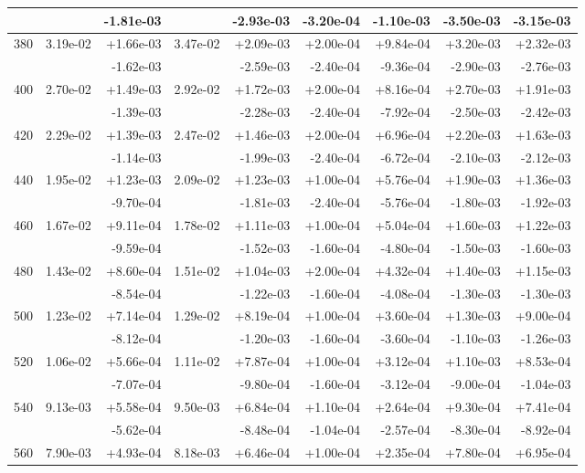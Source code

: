\begin{tabular}{|c|r|r|r|r|r|r|r|r|}
 & & -1.81e-03 & & -2.93e-03 & -3.20e-04 & -1.10e-03 & -3.50e-03 & -3.15e-03 \\
\hline
380 & 3.19e-02 & +1.66e-03 & 3.47e-02 & +2.09e-03 & +2.00e-04 & +9.84e-04 & +3.20e-03 & +2.32e-03\\
 & & -1.62e-03 & & -2.59e-03 & -2.40e-04 & -9.36e-04 & -2.90e-03 & -2.76e-03 \\
\hline
400 & 2.70e-02 & +1.49e-03 & 2.92e-02 & +1.72e-03 & +2.00e-04 & +8.16e-04 & +2.70e-03 & +1.91e-03\\
 & & -1.39e-03 & & -2.28e-03 & -2.40e-04 & -7.92e-04 & -2.50e-03 & -2.42e-03 \\
\hline
420 & 2.29e-02 & +1.39e-03 & 2.47e-02 & +1.46e-03 & +2.00e-04 & +6.96e-04 & +2.20e-03 & +1.63e-03\\
 & & -1.14e-03 & & -1.99e-03 & -2.40e-04 & -6.72e-04 & -2.10e-03 & -2.12e-03 \\
\hline
440 & 1.95e-02 & +1.23e-03 & 2.09e-02 & +1.23e-03 & +1.00e-04 & +5.76e-04 & +1.90e-03 & +1.36e-03\\
 & & -9.70e-04 & & -1.81e-03 & -2.40e-04 & -5.76e-04 & -1.80e-03 & -1.92e-03 \\
\hline
460 & 1.67e-02 & +9.11e-04 & 1.78e-02 & +1.11e-03 & +1.00e-04 & +5.04e-04 & +1.60e-03 & +1.22e-03\\
 & & -9.59e-04 & & -1.52e-03 & -1.60e-04 & -4.80e-04 & -1.50e-03 & -1.60e-03 \\
\hline
480 & 1.43e-02 & +8.60e-04 & 1.51e-02 & +1.04e-03 & +2.00e-04 & +4.32e-04 & +1.40e-03 & +1.15e-03\\
 & & -8.54e-04 & & -1.22e-03 & -1.60e-04 & -4.08e-04 & -1.30e-03 & -1.30e-03 \\
\hline
500 & 1.23e-02 & +7.14e-04 & 1.29e-02 & +8.19e-04 & +1.00e-04 & +3.60e-04 & +1.30e-03 & +9.00e-04\\
 & & -8.12e-04 & & -1.20e-03 & -1.60e-04 & -3.60e-04 & -1.10e-03 & -1.26e-03 \\
\hline
520 & 1.06e-02 & +5.66e-04 & 1.11e-02 & +7.87e-04 & +1.00e-04 & +3.12e-04 & +1.10e-03 & +8.53e-04\\
 & & -7.07e-04 & & -9.80e-04 & -1.60e-04 & -3.12e-04 & -9.00e-04 & -1.04e-03 \\
\hline
540 & 9.13e-03 & +5.58e-04 & 9.50e-03 & +6.84e-04 & +1.10e-04 & +2.64e-04 & +9.30e-04 & +7.41e-04\\
 & & -5.62e-04 & & -8.48e-04 & -1.04e-04 & -2.57e-04 & -8.30e-04 & -8.92e-04 \\
\hline
560 & 7.90e-03 & +4.93e-04 & 8.18e-03 & +6.46e-04 & +1.00e-04 & +2.35e-04 & +7.80e-04 & +6.95e-04\\

\end{tabular}
